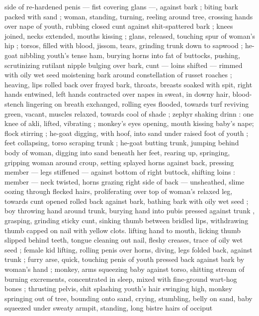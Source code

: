side of re-hardened penis --- fist covering glans ---, against bark ; 
biting bark packed with sand ; woman, standing, turning, reeling 
around tree, crossing hands over nape of youth, rubbing closed cunt 
against shit-spattered bark ; knees joined, necks extended, mouths 
kissing ; glans, released, touching spur of woman's hip ; torsos, filled 
with blood, jissom, tears, grinding trunk down to sapwood ; he-goat 
nibbling youth's tense ham, burying horns into fat of buttocks, 
pushing, scrutinizing rutilant nipple bulging over bark, cunt --- loins 
shifted --- rimmed with oily wet seed moistening bark around 
constellation of russet roaches ; heaving, lips rolled back over frayed 
bark, throats, breasts soaked with spit, right hands entwined, left 
hands contracted over napes in sweat, in downy hair, blood-stench 
lingering on breath exchanged, rolling eyes flooded, towards turf 
reviving green, vacant, muscles relaxed, towards cool of shade ; 
zephyr shaking drinn : one knee of akli, lifted, vibrating ; monkey's 
eyes opening, mouth kissing baby's nape; flock stirring ; he-goat 
digging, with hoof, into sand under raised foot of youth ; feet 
collapsing, torso scraping trunk ; he-goat butting trunk, jumping 
behind body of woman, digging into sand beneath her feet, rearing 
up, springing, gripping woman around croup, setting splayed horns 
against back, pressing member --- legs stiffened --- against bottom 
of right buttock, shifting loins : member --- neck twisted, horns 
grazing right side of back --- unsheathed, slime oozing through 
flecked hairs, proliferating over top of woman's relaxed leg, towards 
cunt opened rolled back against bark, bathing bark with oily wet seed 
; boy throwing hand around trunk, burying hand into pubis pressed 
against trunk , grasping, grinding sticky cunt, sinking thumb between 
bridled lips, withdrawing thumb capped on nail with yellow clots. 
lifting hand to mouth, licking thumb slipped behind teeth, tongue 
cleaning out nail, fleshy creases, trace of oily wet seed ; female kid 
lifting, rolling penis over horns, diving, legs folded back, against 
trunk ; furry arse, quick, touching penis of youth pressed back 
against bark by woman's hand ; monkey, arms squeezing baby 
against torso, shitting stream of burning excrements, concentrated 
in sleep, mixed with fine-ground wart-hog bones ; thrusting pelvis, 
shit splashing youth's hair swinging high, monkey springing out of 
tree, bounding onto sand, crying, stumbling, belly on sand, baby 
squeezed under sweaty armpit, standing, long bistre hairs of occiput 

